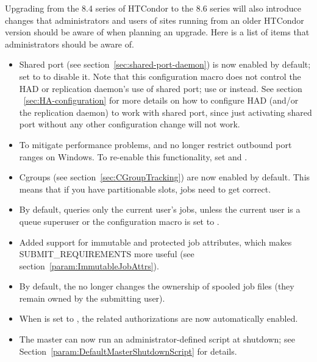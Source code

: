 Upgrading from the 8.4 series of HTCondor to the 8.6 series will
also introduce changes that administrators and users of sites running
from an older HTCondor version should be aware of when planning an upgrade.
Here is a list of items that administrators should be aware of.

\begin{itemize}

\item Shared port (see section~\ref{sec:shared-port-daemon}) is now
enabled by default; set  to  to
disable it.  Note that this configuration macro does not control the HAD or
replication daemon's use of shared port; use 
or  instead.  See section
~\ref{sec:HA-configuration} for more details on how to configure HAD (and/or
the replication daemon) to work with shared port, since just activating
shared port without any other configuration change will not work.

\item To mitigate performance problems,  and
 no longer restrict outbound port ranges on Windows.  To
re-enable this functionality, set  and
.

\item Cgroups (see section~\ref{sec:CGroupTracking}) are now enabled
by default.  This means that if you
have partitionable slots, jobs need to get 
correct.

\item By default,  queries only the current user's jobs,
unless the current user is a queue superuser or the
 configuration macro is set to
.

\item Added support for immutable and protected job attributes, which
makes SUBMIT\_REQUIREMENTS more useful
(see section~\ref{param:ImmutableJobAttrs}).

\item By default, the  no longer changes the ownership
of spooled job files (they remain owned by the submitting user).

\item When  is set
to , the related authorizations are now automatically enabled.

\item The master can now run an administrator-defined script at shutdown;
see Section~\ref{param:DefaultMasterShutdownScript} for details.

\end{itemize}

